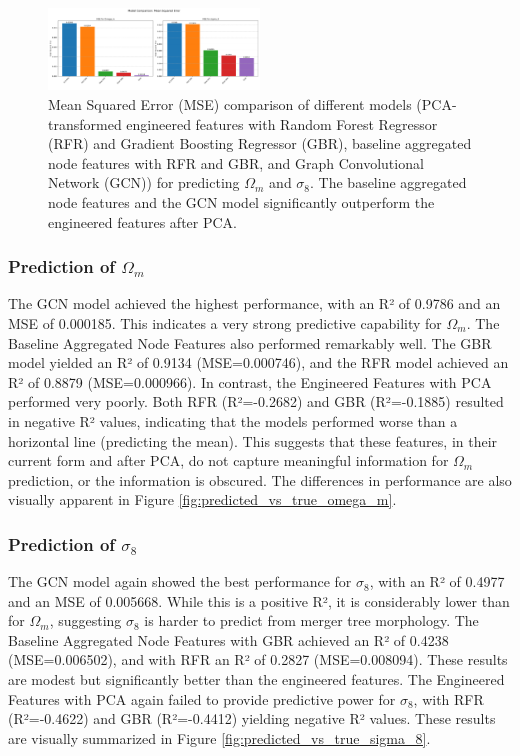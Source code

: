 \documentclass[twocolumn]{aastex631}
\begin{document}
\begin{figure}[h!]
    \centering
    \includegraphics[width=0.5\textwidth]{../input_files/plots/model_performance_mse_12_20250527-135752.png}
    \caption{Mean Squared Error (MSE) comparison of different models (PCA-transformed engineered features with Random Forest Regressor (RFR) and Gradient Boosting Regressor (GBR), baseline aggregated node features with RFR and GBR, and Graph Convolutional Network (GCN)) for predicting $\Omega_m$ and $\sigma_8$. The baseline aggregated node features and the GCN model significantly outperform the engineered features after PCA.}
    \label{fig:model_performance_mse}
\end{figure}

\subsubsection{Prediction of $\Omega_m$}
The GCN model achieved the highest performance, with an R² of 0.9786 and an MSE of 0.000185. This indicates a very strong predictive capability for $\Omega_m$. The Baseline Aggregated Node Features also performed remarkably well. The GBR model yielded an R² of 0.9134 (MSE=0.000746), and the RFR model achieved an R² of 0.8879 (MSE=0.000966). In contrast, the Engineered Features with PCA performed very poorly. Both RFR (R²=-0.2682) and GBR (R²=-0.1885) resulted in negative R² values, indicating that the models performed worse than a horizontal line (predicting the mean). This suggests that these features, in their current form and after PCA, do not capture meaningful information for $\Omega_m$ prediction, or the information is obscured. The differences in performance are also visually apparent in Figure \ref{fig:predicted_vs_true_omega_m}.

\subsubsection{Prediction of $\sigma_8$}
The GCN model again showed the best performance for $\sigma_8$, with an R² of 0.4977 and an MSE of 0.005668. While this is a positive R², it is considerably lower than for $\Omega_m$, suggesting $\sigma_8$ is harder to predict from merger tree morphology. The Baseline Aggregated Node Features with GBR achieved an R² of 0.4238 (MSE=0.006502), and with RFR an R² of 0.2827 (MSE=0.008094). These results are modest but significantly better than the engineered features. The Engineered Features with PCA again failed to provide predictive power for $\sigma_8$, with RFR (R²=-0.4622) and GBR (R²=-0.4412) yielding negative R² values. These results are visually summarized in Figure \ref{fig:predicted_vs_true_sigma_8}.
\end{document}
